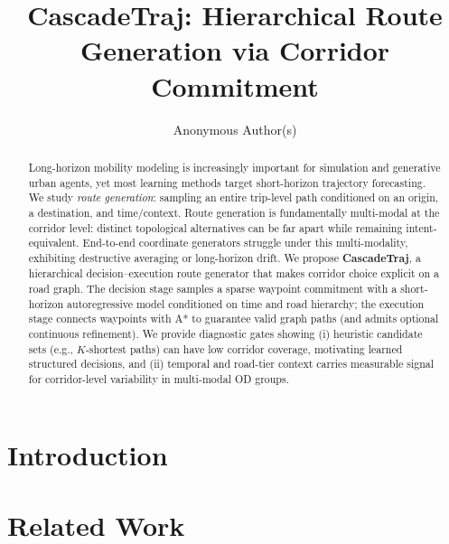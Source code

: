 \documentclass{article}
\title{CascadeTraj: Hierarchical Route Generation via Corridor Commitment}
\author{Anonymous Author(s)}
\date{}
\newif\ificml
\begin{document}
\ificml
\twocolumn[
\icmltitle{CascadeTraj: Hierarchical Route Generation via Corridor Commitment}

\begin{icmlauthorlist}
\icmlauthor{Anonymous Author(s)}{anon}
\end{icmlauthorlist}

\icmlaffiliation{anon}{Anonymous Institution}
\icmlkeywords{route generation, route choice, road graphs, hierarchical generative modeling}
\vskip 0.3in
]
\printAffiliationsAndNotice{} %
\else
\maketitle
\fi

\begin{abstract}
Long-horizon mobility modeling is increasingly important for simulation and generative urban agents, yet most learning methods target short-horizon trajectory forecasting.
We study \emph{route generation}: sampling an entire trip-level path conditioned on an origin, a destination, and time/context.
Route generation is fundamentally multi-modal at the corridor level: distinct topological alternatives can be far apart while remaining intent-equivalent.
End-to-end coordinate generators struggle under this multi-modality, exhibiting destructive averaging or long-horizon drift.
We propose \textbf{CascadeTraj}, a hierarchical decision--execution route generator that makes corridor choice explicit on a road graph.
The decision stage samples a sparse waypoint commitment with a short-horizon autoregressive model conditioned on time and road hierarchy; the execution stage connects waypoints with A* to guarantee valid graph paths (and admits optional continuous refinement).
We provide diagnostic gates showing (i) heuristic candidate sets (e.g., $K$-shortest paths) can have low corridor coverage, motivating learned structured decisions, and (ii) temporal and road-tier context carries measurable signal for corridor-level variability in multi-modal OD groups.
\end{abstract}

\section{Introduction}


\section{Related Work}

\end{document}
